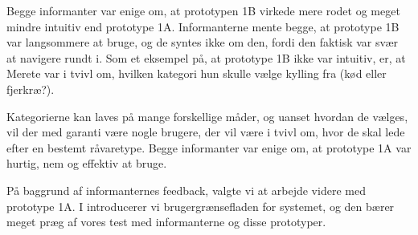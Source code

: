 Begge informanter var enige om, at prototypen 1B virkede mere rodet og meget mindre intuitiv end prototype 1A. Informanterne mente begge, at prototype 1B var langsommere at bruge, og de syntes ikke om den, fordi den faktisk var svær at navigere rundt i. Som et eksempel på, at prototype 1B ikke var intuitiv, er, at Merete var i tvivl om, hvilken kategori hun skulle vælge \fx kylling fra (kød eller fjerkræ?). 

Kategorierne kan laves på mange forskellige måder, og uanset hvordan de vælges, vil der med garanti være nogle brugere, der vil være i tvivl om, hvor de skal lede efter en bestemt råvaretype. Begge informanter var enige om, at prototype 1A var hurtig, nem og effektiv at bruge.

På baggrund af informanternes feedback, valgte vi at arbejde videre med prototype 1A. I  introducerer vi brugergrænsefladen for systemet, og den bærer meget præg af vores test med informanterne og disse prototyper.